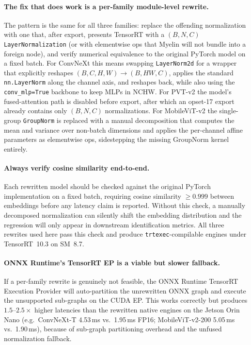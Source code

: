 \documentclass[runningheads,a4paper]{llncs}
\begin{document}
\paragraph{The fix that does work is a per-family module-level rewrite.} The pattern is the same for all three families: replace the offending normalization with one that, after export, presents TensorRT with a $(B,N,C)$ \texttt{LayerNormalization} (or with elementwise ops that Myelin will not bundle into a foreign node), and verify numerical equivalence to the original PyTorch model on a fixed batch. For ConvNeXt this means swapping \texttt{LayerNorm2d} for a wrapper that explicitly reshapes $(B,C,H,W)\!\rightarrow\!(B,HW,C)$, applies the standard \texttt{nn.LayerNorm} along the channel axis, and reshapes back, while also using the \texttt{conv\_mlp=True} backbone to keep MLPs in NCHW. For PVT-v2 the model's fused-attention path is disabled before export, after which an opset-17 export already contains only $(B,N,C)$ normalizations. For MobileViT-v2 the single-group \texttt{GroupNorm} is replaced with a manual decomposition that computes the mean and variance over non-batch dimensions and applies the per-channel affine parameters as elementwise ops, sidestepping the missing GroupNorm kernel entirely.

\paragraph{Always verify cosine similarity end-to-end.} Each rewritten model should be checked against the original PyTorch implementation on a fixed batch, requiring cosine similarity $\geq 0.999$ between embeddings before any latency claim is reported. Without this check, a manually decomposed normalization can silently shift the embedding distribution and the regression will only appear in downstream identification metrics. All three rewrites used here pass this check and produce \texttt{trtexec}-compilable engines under TensorRT~10.3 on SM~8.7.

\paragraph{ONNX Runtime's TensorRT EP is a viable but slower fallback.} If a per-family rewrite is genuinely not feasible, the ONNX Runtime TensorRT Execution Provider will auto-partition the unrewritten ONNX graph and execute the unsupported sub-graphs on the CUDA EP. This works correctly but produces $1.5$--$2.5\times$ higher latencies than the rewritten native engines on the Jetson Orin Nano (e.g.\ ConvNeXt-T 4.53\,ms vs.\ 1.95\,ms FP16; MobileViT-v2-200 5.05\,ms vs.\ 1.90\,ms), because of sub-graph partitioning overhead and the unfused normalization fallback.
\end{document}
